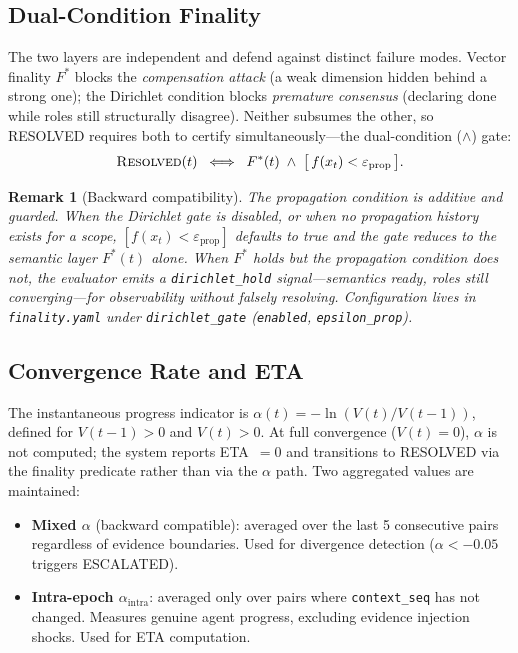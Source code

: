 \documentclass[11pt]{article}
\newtheorem{remark}{Remark}
\begin{document}
\subsection{Dual-Condition Finality}
\label{sec:dual-condition}

The two layers are independent and defend against distinct failure modes. Vector finality $F^*$ blocks the \emph{compensation attack} (a weak dimension hidden behind a strong one); the Dirichlet condition blocks \emph{premature consensus} (declaring done while roles still structurally disagree). Neither subsumes the other, so RESOLVED requires both to certify simultaneously---the dual-condition ($\wedge$) gate:
\[
\textsc{Resolved}(t) \;\iff\; F^*(t) \;\wedge\; \bigl[\, f(x_t) < \varepsilon_{\mathrm{prop}} \,\bigr].
\]

\begin{remark}[Backward compatibility]
The propagation condition is additive and guarded. When the Dirichlet gate is disabled, or when no propagation history exists for a scope, $[f(x_t) < \varepsilon_{\mathrm{prop}}]$ defaults to true and the gate reduces to the semantic layer $F^*(t)$ alone. When $F^*$ holds but the propagation condition does not, the evaluator emits a \texttt{dirichlet\_hold} signal---semantics ready, roles still converging---for observability without falsely resolving. Configuration lives in \texttt{finality.yaml} under \texttt{dirichlet\_gate} (\texttt{enabled}, \texttt{epsilon\_prop}).
\end{remark}

\subsection{Convergence Rate and ETA}
\label{sec:convergence-rates}

The instantaneous progress indicator is $\alpha(t) = -\ln(V(t) / V(t-1))$, defined for $V(t-1) > 0$ and $V(t) > 0$. At full convergence ($V(t) = 0$), $\alpha$ is not computed; the system reports ETA~$= 0$ and transitions to RESOLVED via the finality predicate rather than via the $\alpha$ path. Two aggregated values are maintained:

\begin{itemize}
  \item \textbf{Mixed $\alpha$} (backward compatible): averaged over the last 5 consecutive pairs regardless of evidence boundaries. Used for divergence detection ($\alpha < -0.05$ triggers ESCALATED).
  \item \textbf{Intra-epoch $\alpha_{\text{intra}}$}: averaged only over pairs where \texttt{context\_seq} has not changed. Measures genuine agent progress, excluding evidence injection shocks. Used for ETA computation.
\end{itemize}
\end{document}
